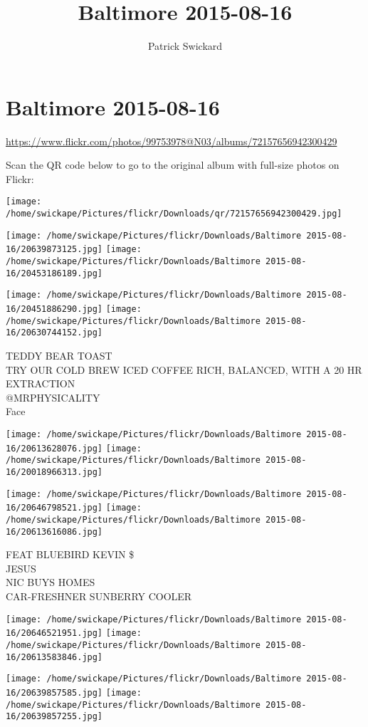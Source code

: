 \documentclass[10pt,letterpaper]{article}
\title{Baltimore 2015-08-16}
\author{Patrick Swickard}
\date{}
\begin{document}
\section*{Baltimore 2015-08-16}

\url{https://www.flickr.com/photos/99753978@N03/albums/72157656942300429}

Scan the QR code below to go to the original album with full-size photos on Flickr:

\texttt{[image: /home/swickape/Pictures/flickr/Downloads/qr/72157656942300429.jpg]}
\pagebreak

\texttt{[image: /home/swickape/Pictures/flickr/Downloads/Baltimore 2015-08-16/20639873125.jpg]}
\texttt{[image: /home/swickape/Pictures/flickr/Downloads/Baltimore 2015-08-16/20453186189.jpg]}

\texttt{[image: /home/swickape/Pictures/flickr/Downloads/Baltimore 2015-08-16/20451886290.jpg]}
\texttt{[image: /home/swickape/Pictures/flickr/Downloads/Baltimore 2015-08-16/20630744152.jpg]}

TEDDY BEAR TOAST\\
TRY OUR COLD BREW ICED COFFEE RICH, BALANCED, WITH A 20 HR EXTRACTION\\
@MRPHYSICALITY\\
Face
\pagebreak

\texttt{[image: /home/swickape/Pictures/flickr/Downloads/Baltimore 2015-08-16/20613628076.jpg]}
\texttt{[image: /home/swickape/Pictures/flickr/Downloads/Baltimore 2015-08-16/20018966313.jpg]}

\texttt{[image: /home/swickape/Pictures/flickr/Downloads/Baltimore 2015-08-16/20646798521.jpg]}
\texttt{[image: /home/swickape/Pictures/flickr/Downloads/Baltimore 2015-08-16/20613616086.jpg]}

FEAT BLUEBIRD KEVIN \$\\
JESUS\\
NIC BUYS HOMES\\
CAR{-}FRESHNER SUNBERRY COOLER
\pagebreak

\texttt{[image: /home/swickape/Pictures/flickr/Downloads/Baltimore 2015-08-16/20646521951.jpg]}
\texttt{[image: /home/swickape/Pictures/flickr/Downloads/Baltimore 2015-08-16/20613583846.jpg]}

\texttt{[image: /home/swickape/Pictures/flickr/Downloads/Baltimore 2015-08-16/20639857585.jpg]}
\texttt{[image: /home/swickape/Pictures/flickr/Downloads/Baltimore 2015-08-16/20639857255.jpg]}
\end{document}
